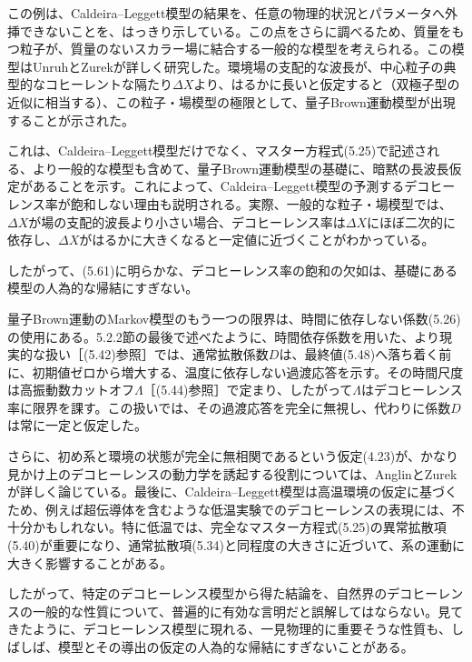 この例は、Caldeira--Leggett模型の結果を、任意の物理的状況とパラメータへ外挿できないことを、はっきり示している。この点をさらに調べるため、質量をもつ粒子が、質量のないスカラー場に結合する一般的な模型を考えられる。この模型はUnruhとZurek\cite{ref109}が詳しく研究した。環境場の支配的な波長が、中心粒子の典型的なコヒーレントな隔たり$\Delta X$より、はるかに長いと仮定すると（双極子型の近似に相当する）、この粒子・場模型の極限として、量子Brown運動模型が出現することが示された\cite{ref015,ref109}。

これは、Caldeira--Leggett模型だけでなく、マスター方程式(5.25)で記述される、より一般的な模型も含めて、量子Brown運動模型の基礎に、暗黙の長波長仮定があることを示す。これによって、Caldeira--Leggett模型の予測するデコヒーレンス率が飽和しない理由も説明される。実際、一般的な粒子・場模型では、$\Delta X$が場の支配的波長より小さい場合、デコヒーレンス率は$\Delta X$にほぼ二次的に依存し、$\Delta X$がはるかに大きくなると一定値に近づくことがわかっている\cite{ref015,ref109,ref229}。

\hypertarget{srcpage:205}{}\label{srcpage:205}
したがって、(5.61)に明らかな、デコヒーレンス率の飽和の欠如は、基礎にある模型の人為的な帰結にすぎない\cite{ref228,ref229}。

量子Brown運動のMarkov模型のもう一つの限界は、時間に依存しない係数(5.26)の使用にある。5.2.2節の最後で述べたように、時間依存係数を用いた、より現実的な扱い［(5.42)参照］では、通常拡散係数$D$は、最終値(5.48)へ落ち着く前に、初期値ゼロから増大する、温度に依存しない過渡応答を示す。その時間尺度は高振動数カットオフ$\Lambda$［(5.44)参照］で定まり、したがって$\Lambda$はデコヒーレンス率に限界を課す。この扱いでは、その過渡応答を完全に無視し、代わりに係数$D$は常に一定と仮定した。

さらに、初め系と環境の状態が完全に無相関であるという仮定(4.23)が、かなり見かけ上のデコヒーレンスの動力学を誘起する役割については、AnglinとZurek\cite{ref229}が詳しく論じている。最後に、Caldeira--Leggett模型は高温環境の仮定に基づくため、例えば超伝導体を含むような低温実験でのデコヒーレンスの表現には、不十分かもしれない。特に低温では、完全なマスター方程式(5.25)の異常拡散項(5.40)が重要になり、通常拡散項(5.34)と同程度の大きさに近づいて、系の運動に大きく影響することがある\cite{ref015,ref220}。

したがって、特定のデコヒーレンス模型から得た結論を、自然界のデコヒーレンスの一般的な性質について、普遍的に有効な言明だと誤解してはならない。見てきたように、デコヒーレンス模型に現れる、一見物理的に重要そうな性質も、しばしば、模型とその導出の仮定の人為的な帰結にすぎないことがある。

